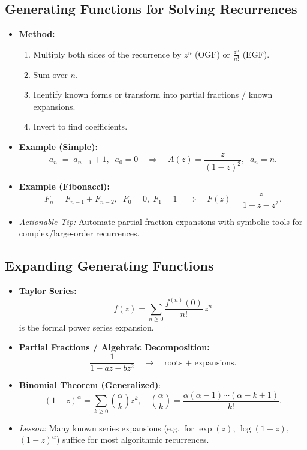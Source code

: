 \documentclass[11pt,letterpaper]{article}
\begin{document}
\subsection{Generating Functions for Solving Recurrences}
\begin{itemize}
  \item \textbf{Method:}
    \begin{enumerate}
      \item Multiply both sides of the recurrence by \(z^n\) (OGF) or \(\frac{z^n}{n!}\) (EGF).
      \item Sum over \(n\).
      \item Identify known forms or transform into partial fractions / known expansions.
      \item Invert to find coefficients.
    \end{enumerate}
  \item \textbf{Example (Simple):} 
    \[
      a_n \;=\; a_{n-1}+1,\;\; a_0=0
      \quad\Longrightarrow\quad
      A(z)=\frac{z}{(1-z)^2},\;\; a_n = n.
    \]
  \item \textbf{Example (Fibonacci):}
    \[
      F_n = F_{n-1}+F_{n-2},\;\;F_0=0,\;F_1=1 
      \quad\Longrightarrow\quad
      F(z)=\frac{z}{1-z-z^2}.
    \]
  \item \emph{Actionable Tip:} Automate partial-fraction expansions with symbolic tools for complex/large-order recurrences.
\end{itemize}

\subsection{Expanding Generating Functions}
\begin{itemize}
  \item \textbf{Taylor Series:} 
    \[
      f(z) = \sum_{n\ge0} \frac{f^{(n)}(0)}{n!}\,z^n
    \]
    is the formal power series expansion. 
  \item \textbf{Partial Fractions / Algebraic Decomposition:} 
    \[
      \frac{1}{1 - az - bz^2} \quad\mapsto\quad \text{roots + expansions.}
    \]
  \item \textbf{Binomial Theorem (Generalized)}:
    \[
      (1+z)^\alpha = \sum_{k\ge0} \binom{\alpha}{k} z^k,\quad
      \binom{\alpha}{k} = \frac{\alpha(\alpha-1)\cdots(\alpha-k+1)}{k!}.
    \]
  \item \textit{Lesson:} Many known series expansions (e.g.\ for \(\exp(z)\), \(\log(1-z)\), \((1 - z)^\alpha\)) suffice for most algorithmic recurrences.
\end{itemize}
\end{document}
